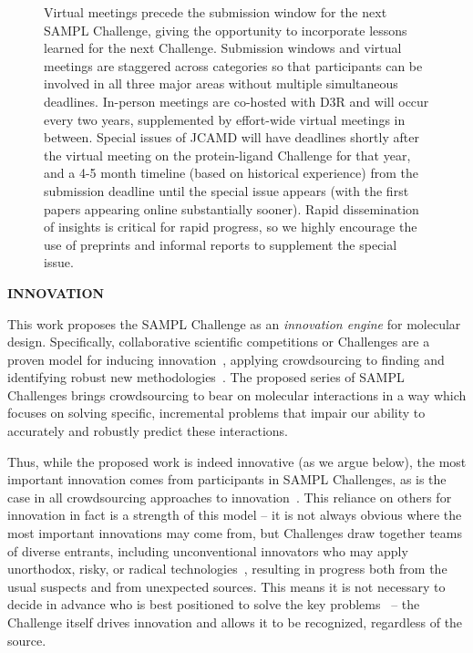 \documentclass[11pt]{article}
\begin{document}
\begin{figure}[h]
{Virtual meetings precede the submission window for the next SAMPL Challenge, giving the opportunity to incorporate lessons learned for the next Challenge.
Submission windows and virtual meetings are staggered across categories so that participants can be involved in all three major areas without multiple simultaneous deadlines.
In-person meetings are co-hosted with D3R and will occur every two years, supplemented by effort-wide virtual meetings in between.
Special issues of JCAMD will have deadlines shortly after the virtual meeting on the protein-ligand Challenge for that year, and a 4-5 month timeline (based on historical experience) from the submission deadline until the special issue appears (with the first papers appearing online substantially sooner).
Rapid dissemination of insights is critical for rapid progress, so we highly encourage the use of preprints and informal reports to supplement the special issue.
\vspace{-0.1in}
\label{figure:timeline}}
\end{figure}

{\Large \bf INNOVATION}

This work proposes the SAMPL Challenge as an \emph{innovation engine} for molecular design.
Specifically, collaborative scientific competitions or Challenges are a proven model for inducing innovation~\cite{Saez-Rodriguez:2016:NatRevGenet, Kay:2011:R&DManage, Eisenstein:2013:NatBiotech}, applying crowdsourcing to finding and identifying robust new methodologies~\cite{Saez-Rodriguez:2016:NatRevGenet}. 
The proposed series of SAMPL Challenges brings crowdsourcing to bear on molecular interactions in a way which focuses on solving specific, incremental problems that impair our ability to accurately and robustly predict these interactions.

Thus, while the proposed work is indeed innovative (as we argue below), the most important innovation comes from participants in SAMPL Challenges, as is the case in all crowdsourcing approaches to innovation~\cite{Saez-Rodriguez:2016:NatRevGenet, Kay:2011:R&DManage}.
This reliance on others for innovation in fact is a strength of this model -- it is not always obvious where the most important innovations may come from, but Challenges draw together teams of diverse entrants, including unconventional innovators who may apply unorthodox, risky, or radical technologies~\cite{Kay:2011:R&DManage, Saez-Rodriguez:2016:NatRevGenet}, resulting in progress both from the usual suspects and from unexpected sources.
This means it is not necessary to decide in advance who is best positioned to solve the key problems~\cite{Saez-Rodriguez:2016:NatRevGenet} -- the Challenge itself drives innovation and allows it to be recognized, regardless of the source.
\end{document}
